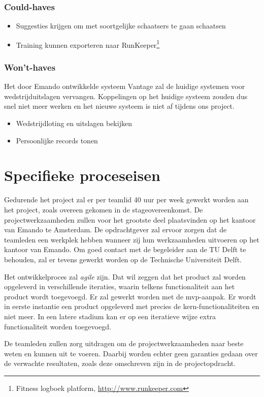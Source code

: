 \subsubsection{Could-haves}
\begin{itemize}
\item Suggesties krijgen om met soortgelijke schaatsers te gaan schaatsen
\item Training kunnen exporteren naar RunKeeper\footnote{Fitness logboek platform, \url{http://www.runkeeper.com}}
\end{itemize}

\subsubsection{Won't-haves}
Het door Emando ontwikkelde systeem Vantage zal de huidige systemen voor wedstrijduitslagen vervangen. Koppelingen op het huidige systeem zouden dus snel niet meer werken en het nieuwe systeem is niet af tijdens ons project.
\begin{itemize}
    \item Wedstrijdloting en uitslagen bekijken
    \item Persoonlijke records tonen
\end{itemize}

\section{Specifieke proceseisen}
Gedurende het project zal er per teamlid 40 uur per week gewerkt worden aan het project, zoals overeen gekomen in de stageovereenkomst.
De projectwerkzaamheden zullen voor het grootste deel plaatsvinden op het kantoor van Emando te Amsterdam. 
De opdrachtgever zal ervoor zorgen dat de teamleden een werkplek hebben wanneer zij hun werkzaamheden uitvoeren op het kantoor van Emando. Om goed contact met de begeleider aan de TU Delft te behouden, zal er tevens gewerkt worden op de Technische Universiteit Delft.

Het ontwikkelproces zal \textit{agile} zijn. Dat wil zeggen dat het product zal worden opgeleverd in verschillende iteraties, waarin telkens functionaliteit aan het product wordt toegevoegd.
Er zal gewerkt worden met de \acl{mvp}-aanpak. Er wordt in eerste instantie een product opgeleverd met precies de kern-functionaliteiten en niet meer. In een latere stadium kan er op een iteratieve wijze extra functionaliteit worden toegevoegd.

De teamleden zullen zorg uitdragen om de projectwerkzaamheden naar beste weten en kunnen uit te voeren. Daarbij worden echter geen garanties gedaan over de verwachte resultaten, zoals deze omschreven zijn in de projectopdracht.

